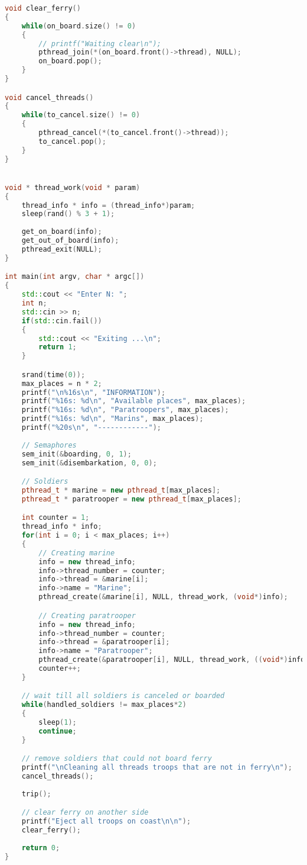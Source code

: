 \documentclass{article}
\begin{document}
\begin{lstlisting}[language=C++]
void clear_ferry()
{
    while(on_board.size() != 0)
    {
        // printf("Waiting clear\n");
        pthread_join(*(on_board.front()->thread), NULL);
        on_board.pop();
    }
}

void cancel_threads()
{
    while(to_cancel.size() != 0)
    {
        pthread_cancel(*(to_cancel.front()->thread));
        to_cancel.pop();
    }
}


void * thread_work(void * param)
{
    thread_info * info = (thread_info*)param;
    sleep(rand() % 3 + 1);
        
    get_on_board(info);
    get_out_of_board(info);
    pthread_exit(NULL);
}

int main(int argv, char * argc[])
{
    std::cout << "Enter N: ";
    int n;
    std::cin >> n;
    if(std::cin.fail())
    {
        std::cout << "Exiting ...\n";
        return 1;
    }

    srand(time(0));
    max_places = n * 2;
    printf("\n%16s\n", "INFORMATION");
    printf("%16s: %d\n", "Available places", max_places);
    printf("%16s: %d\n", "Paratroopers", max_places);
    printf("%16s: %d\n", "Marins", max_places);
    printf("%20s\n", "------------");    
    
    // Semaphores
    sem_init(&boarding, 0, 1);
    sem_init(&disembarkation, 0, 0);

    // Soldiers
    pthread_t * marine = new pthread_t[max_places];
    pthread_t * paratrooper = new pthread_t[max_places];

    int counter = 1;
    thread_info * info;
    for(int i = 0; i < max_places; i++)
    {
        // Creating marine
        info = new thread_info;
        info->thread_number = counter;
        info->thread = &marine[i];
        info->name = "Marine";
        pthread_create(&marine[i], NULL, thread_work, (void*)info);

        // Creating paratrooper
        info = new thread_info;
        info->thread_number = counter;
        info->thread = &paratrooper[i];
        info->name = "Paratrooper";
        pthread_create(&paratrooper[i], NULL, thread_work, ((void*)info));
        counter++;
    }

    // wait till all soldiers is canceled or boarded
    while(handled_soldiers != max_places*2)
    {
        sleep(1);
        continue;
    }

    // remove soldiers that could not board ferry
    printf("\nCleaning all threads troops that are not in ferry\n");
    cancel_threads(); 
    
    trip();

    // clear ferry on another side
    printf("Eject all troops on coast\n\n");
    clear_ferry();
    
    return 0;
}
\end{lstlisting}
\end{document}
